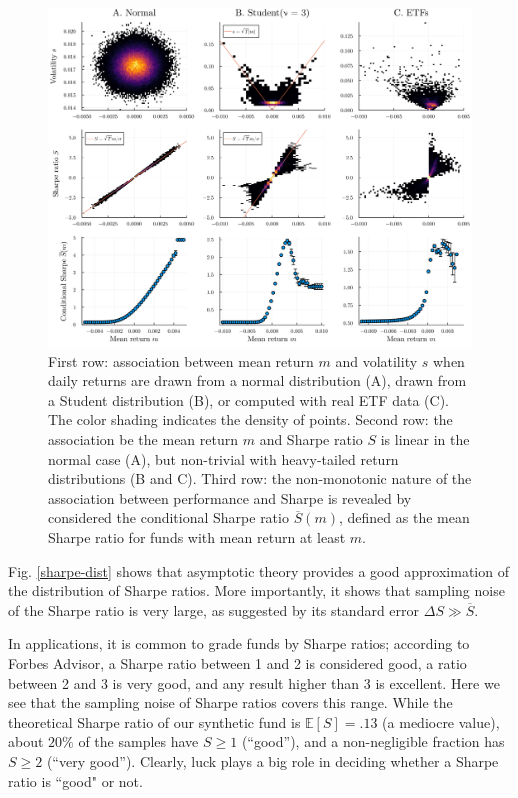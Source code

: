 \documentclass[
reprint,
amsmath,amssymb,
aps,
]{revtex4-2}
\begin{document}
\begin{figure}
    \includegraphics[width = \textwidth]{../plots/main-plot.png}
    \caption{First row: association between mean return $m$ and volatility $s$ when daily returns are drawn from a normal distribution (A), drawn from a Student distribution (B), or computed with real ETF data (C). The color shading indicates the density of points. Second row: the association be the mean return $m$ and Sharpe ratio $S$ is linear in the normal case (A), but non-trivial with heavy-tailed return distributions (B and C). Third row: the non-monotonic nature of the association between performance and Sharpe is revealed by considered the conditional Sharpe ratio $\overline{S}(m)$, defined as the mean Sharpe ratio for funds with mean return at least $m$.}
    \label{main-plot}
\end{figure}

Fig. \ref{sharpe-dist} shows that asymptotic theory provides a good approximation of the distribution of Sharpe ratios.
More importantly, it shows that sampling noise of the Sharpe ratio is very large, as suggested by its standard error $\Delta S \gg \overline{S}$.

In applications, it is common to grade funds by Sharpe ratios; according to Forbes Advisor, a Sharpe ratio between 1 and 2 is considered good, a ratio between 2 and 3 is very good, and any result higher than 3 is excellent. 
Here we see that the sampling noise of Sharpe ratios covers this range. While the theoretical Sharpe ratio of our synthetic fund is $\mathbb{E}[S] = .13$ (a mediocre value), about $20\%$ of the samples have $S \geq 1$ (``good''), and a non-negligible fraction has $S \geq 2$ (``very good''). 
Clearly, luck plays a big role in deciding whether a Sharpe ratio is ``good" or not. 
\end{document}
